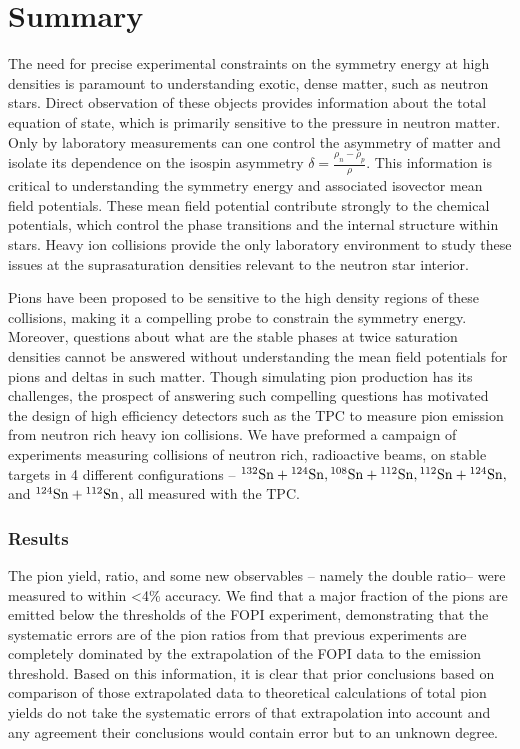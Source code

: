 \chapter{Summary}
The need for precise experimental constraints on the symmetry energy at high densities is paramount to understanding exotic, dense matter, such as neutron stars. Direct observation of these objects provides information about the total equation of state, which is primarily sensitive to the pressure in neutron matter. Only by laboratory measurements can one control the asymmetry of matter and isolate its dependence on the isospin asymmetry $\delta = \frac{\rho_n - \rho_p}{\rho}$. This information is critical to understanding the symmetry energy and associated isovector mean field potentials. These mean field potential contribute strongly to the chemical potentials, which control the phase transitions and the internal structure within stars. Heavy ion collisions provide the only laboratory environment to study these issues at the suprasaturation densities relevant to the neutron star interior.  

Pions have been proposed to be sensitive to the high density regions of these collisions, making it a compelling probe to constrain the symmetry energy. Moreover, questions about what are the stable phases at twice saturation densities cannot be answered without understanding the mean field potentials for pions and deltas in such matter. Though simulating pion production has its challenges, the prospect of answering such compelling questions has motivated the design of high efficiency detectors such as the \spirit TPC to measure pion emission from neutron rich heavy ion collisions. We have preformed a campaign of experiments measuring collisions of neutron rich, radioactive beams, on stable targets in 4 different configurations -- ${}^{132}\mathrm{Sn} + {}^{124}\mathrm{Sn}, {}^{108}\mathrm{Sn} + {}^{112}\mathrm{Sn}, {}^{112}\mathrm{Sn} + {}^{124}\mathrm{Sn},$ and ${}^{124}\mathrm{Sn} + {}^{112}\mathrm{Sn}$, all measured with the \spirit TPC. 

\subsection{Results}
The pion yield, ratio, and some new observables -- namely the double ratio-- were measured to within <4\% accuracy. We find that a major fraction of the pions are emitted below the thresholds of the FOPI experiment, demonstrating that the systematic errors are of the pion ratios from that previous experiments are completely dominated by the extrapolation of the FOPI data to the emission threshold. Based on this information, it is clear that prior conclusions based on comparison of those extrapolated data to theoretical calculations of total pion yields do not take the systematic errors of that extrapolation into account and any agreement their conclusions would contain error but to an unknown degree. 


